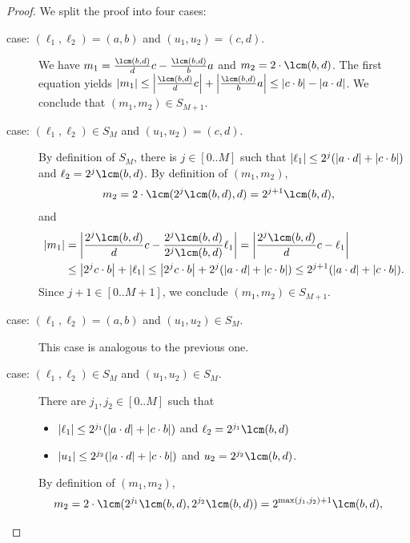 \begin{proof}
  We split the proof into four cases:
  \begin{description}
    \item[case: $(\ell_1,\ell_2) = (a,b)$ and $(u_1,u_2) = (c,d)$.]
      We have $m_1 = \frac{\lcm(b,d)}{d}c - \frac{\lcm(b,d)}{b}a$ 
      and $m_2 = 2 \cdot \lcm(b,d)$. 
      The first equation yields ${\abs{m_1} 
      \leq \abs{\frac{\lcm(b,d)}{d}c}+\abs{\frac{\lcm(b,d)}{b}a} \leq \abs{c \cdot b}-\abs{a \cdot d}}$. 
      We conclude that $(m_1,m_2) \in S_{M+1}$.
    \item[case: $(\ell_1,\ell_2) \in S_M$ and $(u_1,u_2) = (c,d)$.]
      By definition of $S_M$, there is $j \in [0..M]$ 
      such that $\left|\ell_1\right| \leq 2^{j}(\left|a \cdot d\right| + \left|c \cdot b\right|)$ 
      and $\ell_2 = 2^{j} \lcm(b,d)$. By definition of $(m_1,m_2)$, 
      \begin{align*}
        m_2 
          &= 2 \cdot \lcm(2^{j} \lcm(b,d),d)
          = 2^{j+1}\lcm(b,d),
      \end{align*}
      and 
      \begin{align*}
        \abs{m_1} 
           &= \abs{\frac{2^{j}\lcm(b,d)}{d}c - \frac{2^{j}\lcm(b,d)}{2^{j}\lcm(b,d)}\ell_1}
           = \abs{\frac{2^{j}\lcm(b,d)}{d}c - \ell_1}\\
           &\leq \abs{2^{j}c \cdot b} + \abs{\ell_1}\leq \abs{2^{j}c \cdot b} + 2^{j}(\abs{a \cdot d} + \abs{c \cdot b}) 
           \leq 2^{j+1}(\abs{a \cdot d} + \abs{c \cdot b}).
       \end{align*}
       Since $j+1 \in [0..M+1]$, we conclude $(m_1,m_2) \in S_{M+1}$.
    \item[case: $(\ell_1,\ell_2) = (a,b)$ and $(u_1,u_2) \in S_M$.] 
      This case is analogous to the previous one.
    \item[case: $(\ell_1,\ell_2) \in S_M$ and $(u_1,u_2) \in S_M$.]
      There are $j_1,j_2 \in [0..M]$ such that 
      \begin{itemize}
        \item 
          $\left|\ell_1\right| \leq 2^{j_1}(\left|a \cdot d\right| + \left|c \cdot b\right|)$ 
          and $\ell_2 = 2^{j_1} \lcm(b,d)$
        \item 
          $\left|u_1\right| \leq 2^{j_2}(\left|a \cdot d\right| + \left|c \cdot b\right|)$ 
          and $u_2 = 2^{j_2} \lcm(b,d)$.
      \end{itemize}
      By definition of $(m_1,m_2)$, 
      \begin{align*}
        m_2 
          &= 2 \cdot \lcm(2^{j_1} \lcm(b,d),2^{j_2} \lcm(b,d)) = 2^{\max(j_1,j_2)+1}\lcm(b,d),

\end{align*}
\end{description}
\end{proof}
